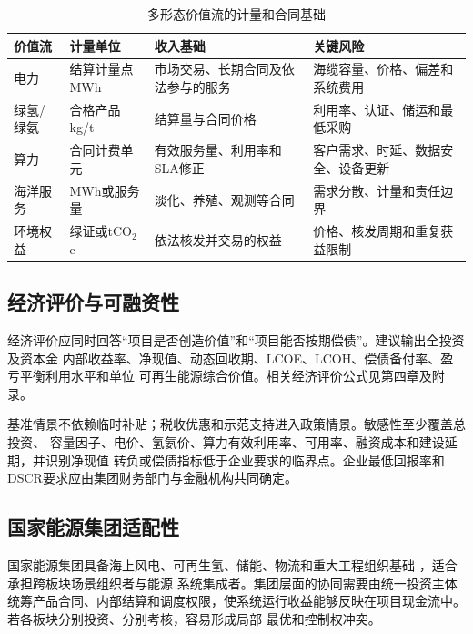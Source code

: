 \begin{table}[H]
\centering
\caption{多形态价值流的计量和合同基础}
\label{tab:c6-value-streams}
\small
\begin{tabularx}{\textwidth}{p{2.2cm} p{2.2cm} X X}
\toprule
价值流 & 计量单位 & 收入基础 & 关键风险\\
\midrule
电力 & 结算计量点MWh & 市场交易、长期合同及依法参与的服务 & 海缆容量、价格、偏差和系统费用\\
绿氢/绿氨 & 合格产品kg/t & 结算量与合同价格 & 利用率、认证、储运和最低采购\\
算力 & 合同计费单元 & 有效服务量、利用率和SLA修正 & 客户需求、时延、数据安全、设备更新\\
海洋服务 & MWh或服务量 & 淡化、养殖、观测等合同 & 需求分散、计量和责任边界\\
环境权益 & 绿证或tCO$_2$e & 依法核发并交易的权益 & 价格、核发周期和重复获益限制\\
\bottomrule
\end{tabularx}
\end{table}

\subsection{经济评价与可融资性}

经济评价应同时回答“项目是否创造价值”和“项目能否按期偿债”。建议输出全投资及资本金
内部收益率、净现值、动态回收期、LCOE、LCOH、偿债备付率、盈亏平衡利用水平和单位
可再生能源综合价值。相关经济评价公式见第四章及附录。

基准情景不依赖临时补贴；税收优惠和示范支持进入政策情景。敏感性至少覆盖总投资、
容量因子、电价、氢氨价、算力有效利用率、可用率、融资成本和建设延期，并识别净现值
转负或偿债指标低于企业要求的临界点。企业最低回报率和DSCR要求应由集团财务部门与金融机构共同确定。

\subsection{国家能源集团适配性}

国家能源集团具备海上风电、可再生氢、储能、物流和重大工程组织基础
\cite{chnenergy-new-productivity,chnenergy-hydrogen}，适合承担跨板块场景组织者与能源
系统集成者。集团层面的协同需要由统一投资主体统筹产品合同、内部结算和调度权限，使系统运行收益能够反映在项目现金流中。若各板块分别投资、分别考核，容易形成局部
最优和控制权冲突。

